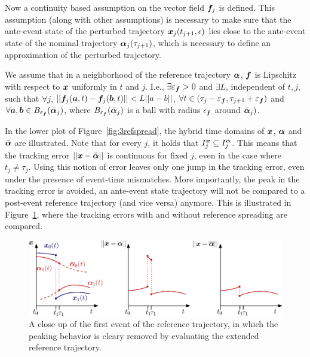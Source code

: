 \documentclass[../DC2017114Bouma.tex]{subfiles}
\begin{document}
Now a continuity based assumption on the vector field ${\boldsymbol{f}}_j$ is defined. This assumption (along with other assumptions) is necessary to make sure that the ante-event state of the perturbed trajectory ${\boldsymbol{x}}_j(t_{j+1},\epsilon)$ lies close to the ante-event state of the nominal trajectory $\boldsymbol{\alpha}_j(\tau_{j+1})$, which is necessary to define an approximation of the perturbed trajectory.

\begin{myass}\label{ass:lipschitz}
We assume that in a neighborhood of the reference trajectory $\boldsymbol{\alpha}$, ${\boldsymbol{f}}$ is Lipschitz with respect to ${\boldsymbol{x}}$ uniformly in $t$ and $j$. I.e., $\exists\varepsilon_{{\boldsymbol{f}}}>0$ and $\exists L$, independent of $t,j$, such that $\forall j$, $||{\boldsymbol{f}}_j({\boldsymbol{a}},t) - {\boldsymbol{f}}_j({\boldsymbol{b}},t)||<L||a-b||$, $\forall t\in (\tau_j - \varepsilon_{{\boldsymbol{f}}},\tau_{j+1} + \varepsilon_{{\boldsymbol{f}}})$ and $\forall {\boldsymbol{a}},{\boldsymbol{b}}\in B_{\varepsilon_{{\boldsymbol{f}}}}(\bar{\boldsymbol{\alpha}}_j)$, where $B_{\varepsilon_{{\boldsymbol{f}}}}(\bar{\boldsymbol{\alpha}}_j)$ is a ball with radius $\epsilon_{{\boldsymbol{f}}}$ around $\bar{\boldsymbol{\alpha}}_j)$.
\end{myass}

In the lower plot of Figure~\ref{fig:3refspread}, the hybrid time domains of ${\boldsymbol{x}}$, $\boldsymbol{\alpha}$ and $\bar{\boldsymbol{\alpha}}$ are illustrated. Note that for every $j$, it holds that $I^{{\boldsymbol{x}}}_j\subseteq I^{\bar{\boldsymbol{\alpha}}}_j$. This means that the tracking error $||{\boldsymbol{x}}-\bar{\boldsymbol{\alpha}}||$ is continuous for fixed $j$, even in the case where $t_j\neq\tau_j$. Using this notion of error leaves only one jump in the tracking error, even under the presence of event-time mismatches. More importantly, the peak in the tracking error is avoided, an ante-event state trajectory will not be compared to a post-event reference trajectory (and vice versa) anymore. This is illustrated in Figure~\ref{fig:3refspreaderrors}, where the tracking errors with and without reference spreading are compared.

\begin{figure}[h]
\centering
\includegraphics[width=\textwidth]{refspreaderrors.eps}\caption{A close up of the  first event of the reference trajectory, in which the peaking behavior is cleary removed by evaluating the extended reference trajectory.} \label{fig:3refspreaderrors}
\end{figure}
\end{document}
